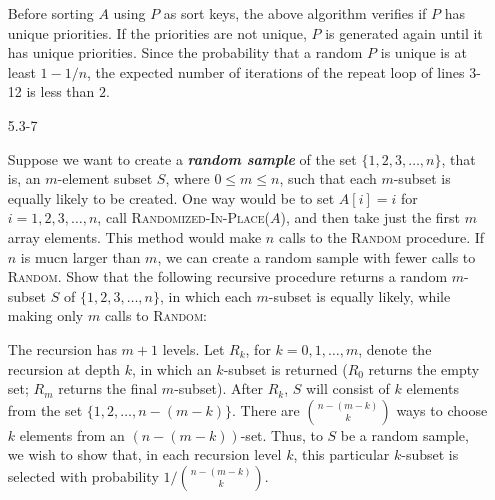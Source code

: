 \documentclass{report}
\makeatletter
\renewenvironment{framed}{%
 \def\FrameCommand##1{\hskip\@totalleftmargin
 \fboxsep=\FrameSep\fbox{##1}}%
 \MakeFramed {\advance\hsize-\width
   \@totalleftmargin\z@ \linewidth\hsize
   \@setminipage}}%
 {\par\unskip\endMakeFramed}
\makeatother
\begin{document}
\begin{enumerate}
\begin{framed}
Before sorting $A$ using $P$ as sort keys, the above algorithm verifies if $P$
has unique priorities. If the priorities are not unique, $P$ is generated again
until it has unique priorities. Since the probability that a random $P$ is
unique is at least $1 - 1/n$, the expected number of iterations of the repeat
loop of lines 3-12 is less than $2$.
\end{framed}

\newpage

\item[5.3{-}7]{Suppose we want to create a \textbf{\emph{random sample}} of the
set $\{1, 2, 3, \dots, n\}$, that is, an $m$-element subset $S$, where
$0 \le m \le n$, such that each $m$-subset is equally likely to be created. One
way would be to set $A[i] = i$ for $i = 1, 2, 3, \dots, n$, call
\textsc{Randomized-In-Place}($A$), and then take just the first $m$ array
elements. This method would make $n$ calls to the \textsc{Random} procedure. If
$n$ is mucn larger than $m$, we can create a random sample with fewer calls to
\textsc{Random}. Show that the following recursive procedure returns a random
$m$-subset $S$ of $\{1, 2, 3, \dots, n\}$, in which each $m$-subset is equally
likely, while making only $m$ calls to \textsc{Random}:

\begin{algorithm}[H]
\SetAlgoNoEnd\DontPrintSemicolon
\BlankLine
{}
\end{algorithm}
}

\begin{framed}
The recursion has $m + 1$ levels. Let $R_k$, for $k = 0, 1, \dots, m$, denote
the recursion at depth $k$, in which an $k$-subset is returned ($R_0$ returns
the empty set; $R_m$ returns the final $m$-subset). After $R_k$, $S$ will
consist of $k$ elements from the set $\{1, 2, \dots, n - (m - k)\}$. There are
$\binom{n - (m - k)}{k}$ ways to choose $k$ elements from an
$(n - (m - k))$-set. Thus, to $S$ be a random sample, we wish to show that, in
each recursion level $k$, this particular $k$-subset is selected with
probability $1/\binom{n - (m - k)}{k}$.


\end{framed}
\end{enumerate}
\end{document}

